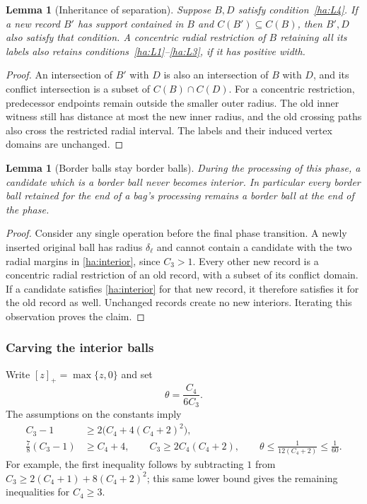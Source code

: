 \documentclass[11pt]{amsart}
\newtheorem{lemma}[theorem]{Lemma}
\theoremstyle{definition}
\theoremstyle{remark}
\numberwithin{equation}{section}
\begin{document}
\begin{lemma}[Inheritance of separation]\label{ha:heredity}
Suppose $B,D$ satisfy condition~\ref{ha:L4}.  If a new record
$B'$ has support contained in $B$ and $C(B')\subseteq C(B)$,
then $B',D$ also satisfy that condition.  A concentric radial
restriction of $B$ retaining all its labels also retains
conditions~\ref{ha:L1}--\ref{ha:L3}, if it has positive width.
\end{lemma}
\begin{proof}
An intersection of $B'$ with $D$ is also an intersection of $B$
with $D$, and its conflict intersection is a subset of
$C(B)\cap C(D)$.  For a concentric restriction, predecessor
endpoints remain outside the smaller outer radius.  The old
inner witness still has distance at most the new inner radius,
and the old crossing paths also cross the restricted radial interval.
The labels and their induced vertex domains are unchanged.
\end{proof}

\begin{lemma}[Border balls stay border balls]\label{ha:border-monotone}
During the processing of this phase, a candidate which is a border
ball never becomes interior.  In particular every border ball
retained for the end of a bag's processing remains a border ball
at the end of the phase.
\end{lemma}
\begin{proof}
Consider any single operation before the final phase transition.
A newly inserted original ball has radius $\delta_\ell$ and cannot
contain a candidate with the two radial margins in
\eqref{ha:interior}, since $C_3>1$.
Every other new record is a concentric radial restriction of an
old record, with a subset of its conflict domain.  If a candidate
satisfies \eqref{ha:interior} for that new record, it therefore
satisfies it for the old record as well.  Unchanged records create
no new interiors.  Iterating this observation proves the claim.
\end{proof}

\subsubsection{Carving the interior balls}
\label{ha:carving}

Write $[z]_+=\max\{z,0\}$ and set
\[
 \theta=\frac{C_4}{6C_3}.
\]
The assumptions on the constants imply
\begin{equation}
 \begin{split}
 C_3-1&\geq 2\bigl(C_4+4(C_4+2)^2\bigr),\\
 \frac78(C_3-1)&\geq C_4+4,\qquad
 C_3\geq 2C_4(C_4+2),\qquad
 \theta\leq\frac1{12(C_4+2)}\leq\frac1{60}.
 \end{split}
 \label{ha:constant-consequences}
\end{equation}
For example, the first inequality follows by subtracting $1$ from
$C_3\geq2(C_4+1)+8(C_4+2)^2$; this same lower bound gives the remaining
inequalities for $C_4\geq3$.
\end{document}
